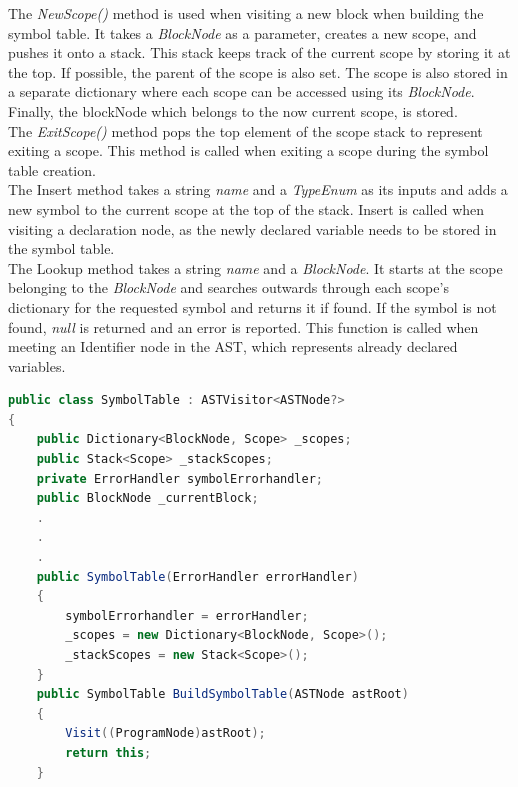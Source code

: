 The \textit{NewScope()} method is used when visiting a new block when building the symbol table. It takes a \textit{BlockNode} as a parameter, creates a new scope, and pushes it onto a stack. This stack keeps track of the current scope by storing it at the top. If possible, the parent of the scope is also set. The scope is also stored in a separate dictionary where each scope can be accessed using its \textit{BlockNode}. Finally, the blockNode which belongs to the now current scope, is stored.\\

The \textit{ExitScope()} method pops the top element of the scope stack to represent exiting a scope. This method is called when exiting a scope during the symbol table creation. \\

The Insert method takes a string \textit{name} and a \textit{TypeEnum} as its inputs and adds a new symbol to the current scope at the top of the stack. Insert is called when visiting a declaration node, as the newly declared variable needs to be stored in the symbol table. \\

The Lookup method takes a string \textit{name} and a \textit{BlockNode}. It starts at the scope belonging to the \textit{BlockNode} and searches outwards through each scope's dictionary for the requested symbol and returns it if found. If the symbol is not found, \textit{null} is returned and an error is reported. This function is called when meeting an Identifier node in the AST, which represents already declared variables.

\begin{lstlisting}[language = csharp, firstnumber=39, label={list:SymbolTableClass},caption=SymbolTable Class - CobraCompiler/SymbolTable.cs]
public class SymbolTable : ASTVisitor<ASTNode?>
{
    public Dictionary<BlockNode, Scope> _scopes;
    public Stack<Scope> _stackScopes;
    private ErrorHandler symbolErrorhandler;
    public BlockNode _currentBlock;
    .
    .
    .
    public SymbolTable(ErrorHandler errorHandler)
    {
        symbolErrorhandler = errorHandler;
        _scopes = new Dictionary<BlockNode, Scope>();
        _stackScopes = new Stack<Scope>();
    }
    public SymbolTable BuildSymbolTable(ASTNode astRoot)
    {
        Visit((ProgramNode)astRoot);
        return this;
    }
\end{lstlisting}


